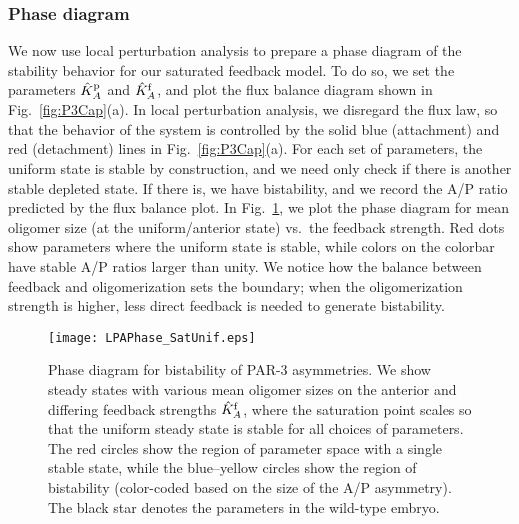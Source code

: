 \documentclass[11pt]{article}
\newcommand{\6}[1]{#1_{\text{6}}}
\newcommand{\3}[1]{#1_{\text{3}}}
\begin{document}
\subsubsection{Phase diagram}
We now use local perturbation analysis to prepare a phase diagram of the stability behavior for our saturated feedback model. To do so, we set the parameters $\hat{K}^\text{p}_A$ and $\hat{K}^\text{f}_A$, and plot the flux balance diagram shown in Fig.\ \ref{fig:P3Cap}(a). In local perturbation analysis, we disregard the flux law, so that the behavior of the system is controlled by the solid blue (attachment) and red (detachment) lines in Fig.\ \ref{fig:P3Cap}(a). For each set of parameters, the uniform state is stable by construction, and we need only check if there is another stable depleted state. If there is, we have bistability, and we record the A/P ratio predicted by the flux balance plot. In Fig.\ \ref{fig:PhaseDiagram}, we plot the phase diagram for mean oligomer size (at the uniform/anterior state) vs.\ the feedback strength. Red dots show parameters where the uniform state is stable, while colors on the colorbar have stable A/P ratios larger than unity. We notice how the balance between feedback and oligomerization sets the boundary; when the oligomerization strength is higher, less direct feedback is needed to generate bistability.
\begin{figure}
\centering
\texttt{[image: LPAPhase\_SatUnif.eps]}
\caption{\label{fig:PhaseDiagram}Phase diagram for bistability of PAR-3 asymmetries. We show steady states with various mean oligomer sizes on the anterior and differing feedback strengths $\hat{K}^\text{f}_A$, where the saturation point scales so that the uniform steady state is stable for all choices of parameters. The red circles show the region of parameter space with a single stable state, while the blue--yellow circles show the region of bistability (color-coded based on the size of the A/P asymmetry). The black star denotes the parameters in the wild-type embryo. }
\end{figure}
\end{document}
